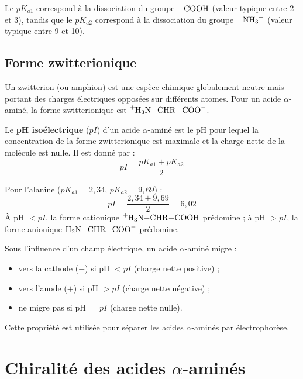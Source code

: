 \begin{remarque}
Le $pK_{a1}$ correspond à la dissociation du groupe $\ce{-COOH}$ (valeur typique entre 2 et 3), tandis que le $pK_{a2}$ correspond à la dissociation du groupe $\ce{-NH3+}$ (valeur typique entre 9 et 10).
\end{remarque}

\subsection{Forme zwitterionique}

\begin{definition}[Zwitterion]
Un zwitterion (ou amphion) est une espèce chimique globalement neutre mais portant des charges électriques opposées sur différents atomes. Pour un acide $\alpha$-aminé, la forme zwitterionique est $\ce{^{+}H3N-CHR-COO-}$.
\end{definition}

\begin{propriete}
Le \textbf{pH isoélectrique} ($pI$) d'un acide $\alpha$-aminé est le pH pour lequel la concentration de la forme zwitterionique est maximale et la charge nette de la molécule est nulle. Il est donné par :
\[
pI = \frac{pK_{a1} + pK_{a2}}{2}
\]
\end{propriete}

\begin{exemple}
Pour l'alanine ($pK_{a1} = 2,34$, $pK_{a2} = 9,69$) :
\[
pI = \frac{2,34 + 9,69}{2} = 6,02
\]
À pH $< pI$, la forme cationique $\ce{^{+}H3N-CHR-COOH}$ prédomine ; à pH $> pI$, la forme anionique $\ce{H2N-CHR-COO-}$ prédomine.
\end{exemple}

\begin{experience}
Sous l'influence d'un champ électrique, un acide $\alpha$-aminé migre :
\begin{itemize}
    \item vers la cathode ($-$) si pH $< pI$ (charge nette positive) ;
    \item vers l'anode ($+$) si pH $> pI$ (charge nette négative) ;
    \item ne migre pas si pH $= pI$ (charge nette nulle).
\end{itemize}
Cette propriété est utilisée pour séparer les acides $\alpha$-aminés par électrophorèse.
\end{experience}

\section{Chiralité des acides $\alpha$-aminés}

